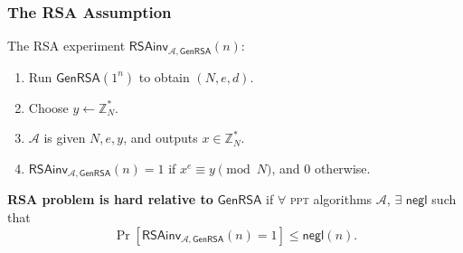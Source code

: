 \begin{frame}\frametitle{The RSA Assumption}
The RSA experiment $\mathsf{RSAinv}_{\mathcal{A},\mathsf{GenRSA}}(n)$:
\begin{enumerate}
\item Run $\mathsf{GenRSA}(1^n)$ to obtain $(N,e,d)$.
\item Choose $y \gets \mathbb{Z}^*_N$.
\item $\mathcal{A}$ is given $N,e,y$, and outputs $x \in \mathbb{Z}^*_N$.
\item $\mathsf{RSAinv}_{\mathcal{A},\mathsf{GenRSA}}(n)=1$ if $x^e \equiv y \pmod N$, and 0 otherwise.
\end{enumerate}
\begin{definition}
\textbf{RSA problem is hard relative to} $\mathsf{GenRSA}$ if $\forall$ \textsc{ppt} algorithms $\mathcal{A}$, $\exists$ $\mathsf{negl}$ such that
\[ \Pr[\mathsf{RSAinv}_{\mathcal{A},\mathsf{GenRSA}}(n) = 1] \le \mathsf{negl}(n).\]
\end{definition}
\end{frame}

